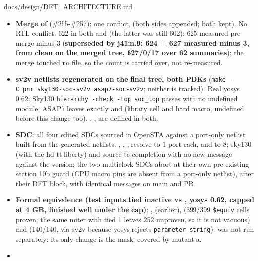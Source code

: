 \begin{relocated}{docs/design/DFT_ARCHITECTURE.md}
\begin{itemize}
\tightlist
\item
  \textbf{Merge of } (\#255-\#257): one conflict,
   (both sides appended; both
  kept). No RTL conflict.  622 in both
   and  (the latter was still
  602): 625 measured pre-merge minus 3 (\textbf{superseded by j41m.9:
  624 = 627 measured minus 3,  from clean on the merged
  tree, 627/0/17 over 62 summaries}); the merge touched no
   file, so the count is carried over, not
  re-measured.
\item
  \textbf{sv2v netlists regenerated on the final tree, both PDKs}
  (\texttt{make\ -\allowbreak{}C\ pnr\ sky130-\allowbreak{}soc-\allowbreak{}sv2v\ asap7-\allowbreak{}soc-\allowbreak{}sv2v};
  neither is tracked). Real yosys 0.62: Sky130
  \texttt{hierarchy\ -\allowbreak{}check\ -\allowbreak{}top\ soc\_\allowbreak{}top}
  passes with no undefined module; ASAP7 leaves exactly
   and  (library
  cell and hard macro, undefined before this change too).
  , ,  are
  defined in both.
\item
  \textbf{SDC}: all four edited SDCs sourced in OpenSTA against a
  port-only  netlist built from the generated netlists.
  , , ,
   resolve to 1 port each,  and
   to 8; sky130 (with the hd tt liberty) and
   source to completion with no new message against
  the  version; the two multiclock SDCs abort at their
  own pre-existing section 10b guard (CPU macro pins are absent from a
  port-only netlist), after their DFT block, with identical messages on
  main and PR.
\item
  \textbf{Formal equivalence (test inputs tied inactive vs
  , yosys 0.62, capped at 4 GB, finished well under
  the cap)}: ,  (earlier),
   (399/399 \texttt{\$equiv} cells proven; the same
  miter with  tied 1 leaves 252 unproven, so it is not
  vacuous) and  (140/140, via sv2v because yosys
  rejects \texttt{parameter\ string}).  was not run
  separately: its only change is the  mask, covered by
  mutant a.
\item

\end{itemize}
\end{relocated}
